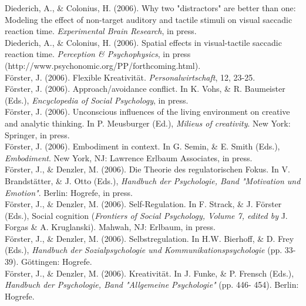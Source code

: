Diederich, A., \& Colonius, H. (2006). Why two "distractors" are better than one: Modeling the effect of non-target auditory and tactile stimuli on visual saccadic reaction time. \textit{Experimental Brain Research}, in press.\\ 

Diederich, A., \& Colonius, H. (2006). Spatial effects in visual-tactile saccadic reaction time. \textit{Perception \& Psychophysics}, in press (http://www.psychonomic.org/PP/forthcoming.html).\\ 

F\"{o}rster, J. (2006). Flexible Kreativit\"{a}t. \textit{Personalwirtschaft}, 12, 23-25.\\ 

F\"{o}rster, J. (2006). Approach/avoidance conflict. In K. Vohs, \& R. Baumeister (Eds.), \textit{Encyclopedia of Social Psychology}, in press.\\ 

F\"{o}rster, J. (2006). Unconscious influences of the living environment on creative and analytic thinking. In P. Meusburger (Ed.), \textit{Milieus of creativity}. New York: Springer, in press.\\ 

F\"{o}rster, J. (2006). Embodiment in context. In G. Semin, \& E. Smith (Eds.), \textit{Embodiment}. New York, NJ: Lawrence Erlbaum Associates, in press.\\ 

F\"{o}rster, J., \& Denzler, M. (2006). Die Theorie des regulatorischen Fokus. In V. Brandst\"{a}tter, \& J. Otto (Eds.), \textit{Handbuch der Psychologie, Band "Motivation und Emotion"}. Berlin: Hogrefe, in press.\\ 

F\"{o}rster, J., \& Denzler, M. (2006). Self-Regulation. In F. Strack, \& J. F\"{o}rster (Eds.), Social cognition (\textit{Frontiers of Social Psychology, Volume 7, edited by} J. Forgas \& A. Kruglanski). Mahwah, NJ: Erlbaum, in press.\\ 

F\"{o}rster, J., \& Denzler, M. (2006). Selbstregulation. In H.W. Bierhoff, \& D. Frey (Eds.), \textit{Handbuch der Sozialpsychologie und Kommunikationspsychologie} (pp. 33-39). G\"{o}ttingen: Hogrefe. \\ 

F\"{o}rster, J., \& Denzler, M. (2006). Kreativit\"{a}t. In J. Funke, \& P. Frensch (Eds.), \textit{Handbuch der Psychologie, Band "Allgemeine Psychologie"} (pp. 446- 454). Berlin: Hogrefe. \\ 

